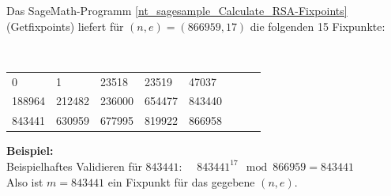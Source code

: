 \begin{refsegment}
   Das SageMath-Programm \ref{nt_sagesample_Calculate_RSA-Fixpoints} (Getfixpoints) liefert für $(n,e) = (866959, 17)$ die folgenden 15 Fixpunkte:
%
%
%
\begin{table}[ht]
\begin{center}
{\tt
\begin{tabular}{llllllll}
     0 &      1 &  23518 &  23519 &  47037\\
188964 & 212482 & 236000 & 654477 & 843440\\
843441 & 630959 & 677995 & 819922 & 866958
\end{tabular} } %
\end{center}
\end{table}

 \textbf{Beispiel:}\\
Beispielhaftes Validieren für $ 843441 $:~~
$843441^{17} \mod 866959 = 843441$\\
Also ist $ m = 843441$ ein Fixpunkt für das gegebene $(n,e)$.\\


\end{refsegment}

